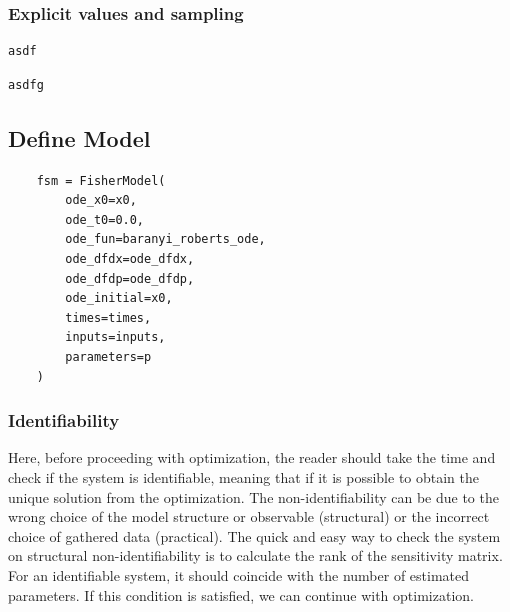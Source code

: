 \documentclass[10pt,A4paper]{article}
\begin{document}
\subsubsection*{Explicit values and sampling}
\begin{verbatim}
asdf
\end{verbatim}

\begin{verbatim}
asdfg
\end{verbatim}
%
\subsection*{Define Model}
\begin{verbatim}
    fsm = FisherModel(
        ode_x0=x0,
        ode_t0=0.0,
        ode_fun=baranyi_roberts_ode,
        ode_dfdx=ode_dfdx,
        ode_dfdp=ode_dfdp,
        ode_initial=x0,
        times=times,
        inputs=inputs,
        parameters=p
    )
\end{verbatim}
%
\subsubsection*{Identifiability}
Here, before proceeding with optimization, the reader should take the time and check if the system is identifiable, meaning that if it is possible to obtain the unique solution from the optimization. 
The non-identifiability can be due to the wrong choice of the model structure or observable (structural) or the incorrect choice of gathered data (practical).
The quick and easy way to check the system on structural non-identifiability is to calculate the rank of the sensitivity matrix.
For an identifiable system, it should coincide with the number of estimated parameters.
If this condition is satisfied, we can continue with optimization.
%
\end{document}
